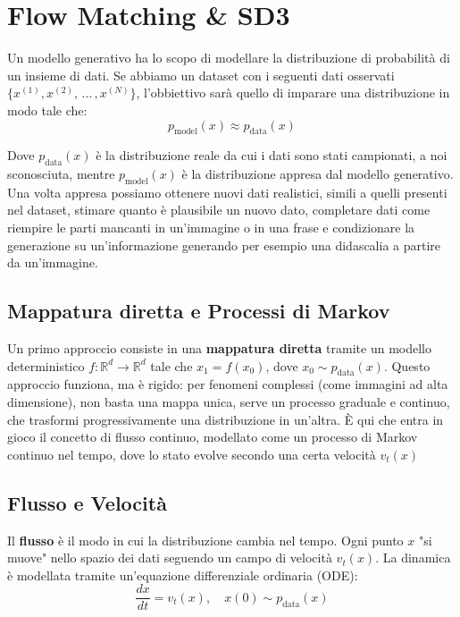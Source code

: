 \chapter{Flow Matching \& SD3}

Un modello generativo ha lo scopo di modellare la distribuzione di probabilità di un insieme di dati. Se abbiamo un dataset con i seguenti dati osservati $\{x^{(1)},x^{(2)},\,\dots\,,x^{(N)}\}$, l'obbiettivo sarà quello di imparare una distribuzione in modo tale che:
\[
    p_{\operatorname{model}}(x)\approx p_{\operatorname{data}}(x)
\]

Dove $p_{\operatorname{data}}(x)$ è la distribuzione reale da cui i dati sono stati campionati, a noi sconosciuta, mentre $p_{\operatorname{model}}(x)$ è la distribuzione appresa dal modello generativo. Una volta appresa possiamo ottenere nuovi dati realistici, simili a quelli presenti nel dataset, stimare quanto è plausibile un nuovo dato, completare dati come riempire le parti mancanti in un'immagine o in una frase e condizionare la generazione su un'informazione generando per esempio una didascalia a partire da un'immagine.

\section{Mappatura diretta e Processi di Markov}
Un primo approccio consiste in una \textbf{mappatura diretta} tramite un modello deterministico $f: \mathbb{R}^d \to \mathbb{R}^d$ tale che $x_1 = f(x_0)$, dove $x_0 \sim p_{\operatorname{data}}(x)$. Questo approccio funziona, ma è rigido: per fenomeni complessi (come immagini ad alta dimensione), non basta una mappa unica, serve un processo graduale e continuo, che trasformi progressivamente una distribuzione in un’altra. È qui che entra in gioco il concetto di flusso continuo, modellato come un processo di Markov continuo nel tempo, dove lo stato evolve secondo una certa velocità $v_t(x)$

\section{Flusso e Velocità}
Il \textbf{flusso} è il modo in cui la distribuzione cambia nel tempo. Ogni punto $x$ "si muove" nello spazio dei dati seguendo un campo di velocità $v_t(x)$. La dinamica è modellata tramite un'equazione differenziale ordinaria (ODE):
\begin{equation}
    \frac{dx}{dt} = v_t(x), \quad x(0) \sim p_{\operatorname{data}}(x)
\end{equation}

